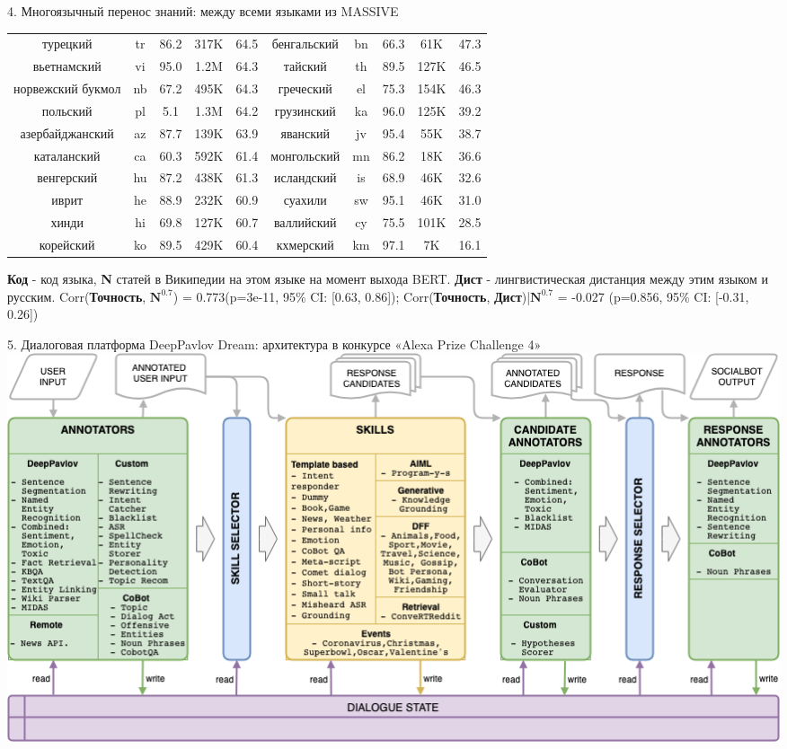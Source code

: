 \begin{frame}{4. Многоязычный перенос знаний: между всеми языками из MASSIVE}
{\begin{tabular}[baseline={(0,2.1)}]{|c|c|c|c|c||c|c|c|c|c|}
турецкий & tr & 86.2 & 317K & 64.5 & бенгальский & bn & 66.3 & 61K & 47.3 \\
вьетнамский & vi & 95.0 & 1.2M & 64.3 & тайский & th & 89.5 & 127K & 46.5 \\
норвежский букмол & nb & 67.2 & 495K & 64.3 & греческий & el & 75.3 & 154K & 46.3 \\
польский & pl & 5.1 & 1.3M & 64.2 & грузинский & ka & 96.0 & 125K & 39.2\\
азербайджанский & az & 87.7 & 139K & 63.9 & яванский & jv & 95.4 & 55K & 38.7 \\
каталанский & ca & 60.3 & 592K & 61.4 & монгольский & mn & 86.2 & 18K & 36.6 \\
венгерский & hu & 87.2 & 438K & 61.3 & исландский & is & 68.9 & 46K & 32.6 \\
иврит & he & 88.9 & 232K & 60.9 & суахили & sw & 95.1 & 46K & 31.0 \\
хинди & hi & 69.8 & 127K & 60.7 & валлийский & cy & 75.5 & 101K & 28.5 \\
корейский & ko & 89.5 & 429K & 60.4 & кхмерский & km & 97.1 & 7K & 16.1\\ \hline
\end{tabular}}
\newline
\scriptsize \textbf{Код} - код языка, \textbf{N} статей в Википедии на этом языке на момент выхода BERT.
\newline \textbf{Дист} - лингвистическая дистанция между этим языком и русским.
\newline
Corr(\textbf{Точность}, $\textbf{N}^{0.7}$) = 0.773(p=3e-11, 95\% CI: [0.63, 0.86]);
Corr(\textbf{Точность}, \textbf{Дист})|$\textbf{N}^{0.7}$ = -0.027 (p=0.856, 95\% CI: [-0.31, 0.26])
\end{frame}


\begin{frame}{5. Диалоговая платформа DeepPavlov Dream: архитектура в конкурсе «Alexa Prize Challenge 4»}
    \centering
    \includegraphics[width=1\linewidth]{images/Alexa2_.png} 
\end{frame}

